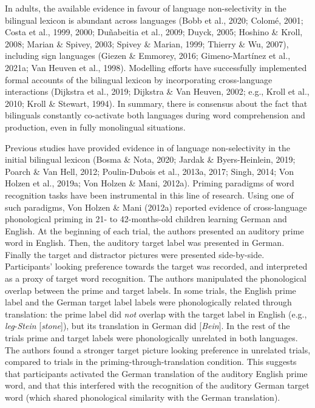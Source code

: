\documentclass[
  12pt,
  b5paperpaper,
  twoside]{scrreprt}
\begin{document}
In adults, the available evidence in favour of language non-selectivity
in the bilingual lexicon is abundant across languages (Bobb et al.,
2020; Colomé, 2001; Costa et al., 1999, 2000; Duñabeitia et al., 2009;
Duyck, 2005; Hoshino \& Kroll, 2008; Marian \& Spivey, 2003; Spivey \&
Marian, 1999; Thierry \& Wu, 2007), including sign languages (Giezen \&
Emmorey, 2016; Gimeno-Martínez et al., 2021a; Van Heuven et al., 1998).
Modelling efforts have successfully implemented formal accounts of the
bilingual lexicon by incorporating cross-language interactions (Dijkstra
et al., 2019; Dijkstra \& Van Heuven, 2002; e.g., Kroll et al., 2010;
Kroll \& Stewart, 1994). In summary, there is consensus about the fact
that bilinguals constantly co-activate both languages during word
comprehension and production, even in fully monolingual situations.

Previous studies have provided evidence in of language non-selectivity
in the initial bilingual lexicon (Bosma \& Nota, 2020; Jardak \&
Byers-Heinlein, 2019; Poarch \& Van Hell, 2012; Poulin-Dubois et al.,
2013a, 2017; Singh, 2014; Von Holzen et al., 2019a; Von Holzen \& Mani,
2012a). Priming paradigms of word recognition tasks have been
instrumental in this line of research. Using one of such paradigms, Von
Holzen \& Mani (2012a) reported evidence of cross-language phonological
priming in 21- to 42-months-old children learning German and English. At
the beginning of each trial, the authors presented an auditory prime
word in English. Then, the auditory target label was presented in
German. Finally the target and distractor pictures were presented
side-by-side. Participants' looking preference towards the target was
recorded, and interpreted as a proxy of target word recognition. The
authors manipulated the phonological overlap between the prime and
target labels. In some trials, the English prime label and the German
target label labels were phonologically related through translation: the
prime label did \emph{not} overlap with the target label in English
(e.g., \emph{leg}-\emph{Stein} {[}\emph{stone}{]}), but its translation
in German did {[}\emph{Bein}{]}. In the rest of the trials prime and
target labels were phonologically unrelated in both languages. The
authors found a stronger target picture looking preference in unrelated
trials, compared to trials in the priming-through-translation condition.
This suggests that participants activated the German translation of the
auditory English prime word, and that this interfered with the
recognition of the auditory German target word (which shared
phonological similarity with the German translation).
\end{document}
